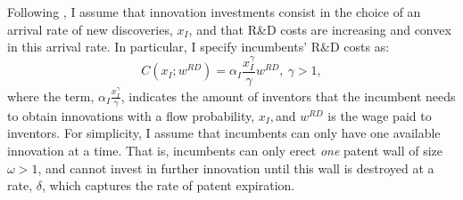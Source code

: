 Following \citet{acemogluIntellectualPropertyRights2012}, I assume
that innovation investments consist in the choice of an arrival rate
of new discoveries, $x_{I}$, and that R\&D costs are increasing and
convex in this arrival rate. In particular, I specify incumbents'
R\&D costs as:
\[
C\left(x_{I};w^{RD}\right)=\alpha_{I}\frac{x_{I}^{\gamma}}{\gamma}w^{RD},\ \gamma>1,
\]
where the term, $\alpha_{I}\frac{x_{I}^{\gamma}}{\gamma}$, indicates
the amount of inventors that the incumbent needs to obtain innovations
with a flow probability, $x_{I},$and $w^{RD}$ is the wage paid to
inventors. For simplicity, I assume that incumbents can only have
one available innovation at a time. That is, incumbents can only erect
\emph{one} patent wall of size $\omega>1$, and cannot invest in further
innovation until this wall is destroyed at a rate, $\delta$, which
captures the rate of patent expiration.

